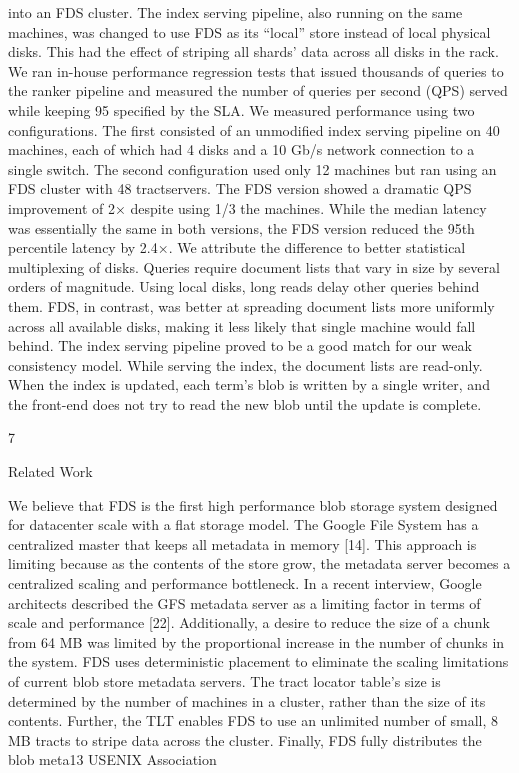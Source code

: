 into an FDS cluster. The index serving pipeline, also
running on the same machines, was changed to use FDS
as its “local” store instead of local physical disks. This
had the effect of striping all shards’ data across all disks
in the rack.
We ran in-house performance regression tests that issued thousands of queries to the ranker pipeline and measured the number of queries per second (QPS) served
while keeping 95%
specified by the SLA. We measured performance using
two configurations. The first consisted of an unmodified
index serving pipeline on 40 machines, each of which
had 4 disks and a 10 Gb/s network connection to a single
switch. The second configuration used only 12 machines
but ran using an FDS cluster with 48 tractservers.
The FDS version showed a dramatic QPS improvement of 2× despite using 1/3 the machines. While the
median latency was essentially the same in both versions,
the FDS version reduced the 95th percentile latency by
2.4×. We attribute the difference to better statistical multiplexing of disks. Queries require document lists that
vary in size by several orders of magnitude. Using local
disks, long reads delay other queries behind them. FDS,
in contrast, was better at spreading document lists more
uniformly across all available disks, making it less likely
that single machine would fall behind.
The index serving pipeline proved to be a good match
for our weak consistency model. While serving the index, the document lists are read-only. When the index is
updated, each term’s blob is written by a single writer,
and the front-end does not try to read the new blob until
the update is complete.

7

Related Work

We believe that FDS is the first high performance blob
storage system designed for datacenter scale with a flat
storage model.
The Google File System has a centralized master that
keeps all metadata in memory [14]. This approach is
limiting because as the contents of the store grow, the
metadata server becomes a centralized scaling and performance bottleneck. In a recent interview, Google architects described the GFS metadata server as a limiting
factor in terms of scale and performance [22]. Additionally, a desire to reduce the size of a chunk from 64 MB
was limited by the proportional increase in the number
of chunks in the system.
FDS uses deterministic placement to eliminate the
scaling limitations of current blob store metadata servers.
The tract locator table’s size is determined by the number of machines in a cluster, rather than the size of its
contents. Further, the TLT enables FDS to use an unlimited number of small, 8 MB tracts to stripe data across
the cluster. Finally, FDS fully distributes the blob meta13
USENIX Association  

